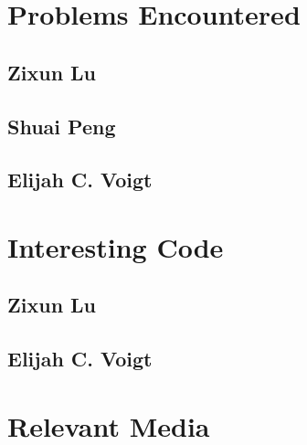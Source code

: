 \section{Problems Encountered}

\subsection{Zixun Lu}



\subsection{Shuai Peng}



\subsection{Elijah C. Voigt}



\section{Interesting Code}

\subsection{Zixun Lu}

\subsection{Elijah C. Voigt}

\section{Relevant Media}






\printbibliography


